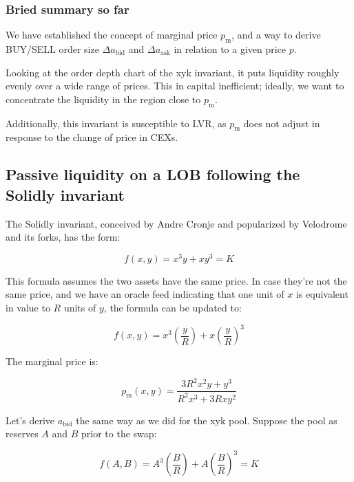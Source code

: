 \documentclass{article}
\begin{document}
\subsubsection{Bried summary so far}

We have established the concept of marginal price $p_{\mathrm{m}}$, and a way to derive BUY/SELL order size $\Delta a_{\mathrm{bid}}$ and $\Delta a_{\mathrm{ask}}$ in relation to a given price $p$.

Looking at the order depth chart of the xyk invariant, it puts liquidity roughly evenly over a wide range of prices. This in capital inefficient; ideally, we want to concentrate the liquidity in the region close to $p_{\mathrm{m}}$.

Additionally, this invariant is susceptible to LVR, as $p_{\mathrm{m}}$ does not adjust in response to the change of price in CEXs.

\subsection{Passive liquidity on a LOB following the Solidly invariant}

The Solidly invariant, conceived by Andre Cronje\supercite{andrecronjetwitter} and popularized by Velodrome\supercite{velodrome} and its forks,\supercite{aerodrome} has the form:

\begin{equation}
  f(x, y) = x^3 y + x y^3 = K
\end{equation}

This formula assumes the two assets have the same price. In case they're not the same price, and we have an oracle feed indicating that one unit of $x$ is equivalent in value to $R$ units of $y$, the formula can be updated to:

\begin{equation}
  f(x, y) = x^3 \left( \frac{y}{R} \right) + x \left( \frac{y}{R} \right)^3
\end{equation}

The marginal price is:

\begin{equation}
  p_{\mathrm{m}}(x, y) = \frac{3 R^2 x^2 y + y^3}{R^2 x^3 + 3 R x y^2}
\end{equation}

Let's derive $a_{\mathrm{bid}}$ the same way as we did for the xyk pool. Suppose the pool as reserves $A$ and $B$ prior to the swap:

\begin{equation}
  f(A, B) = A^3 \left( \frac{B}{R} \right) + A \left( \frac{B}{R} \right)^3 = K
\end{equation}
\end{document}
